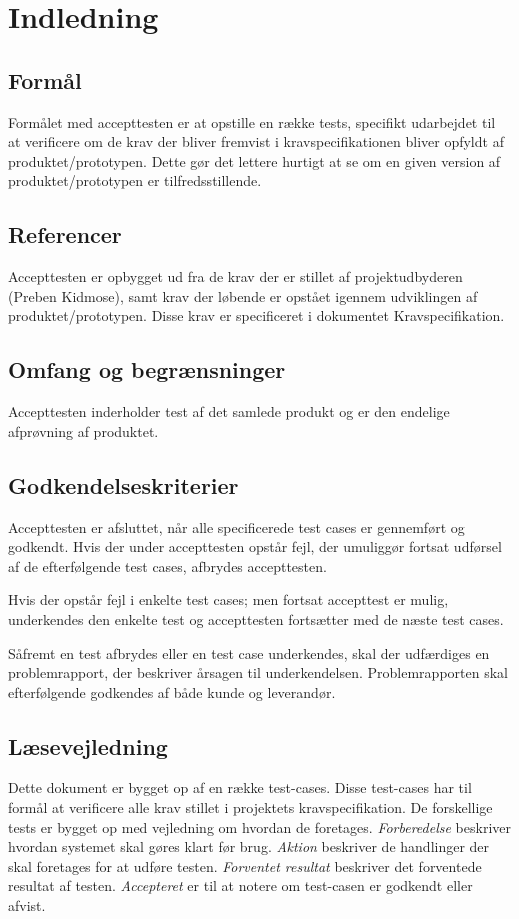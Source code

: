\documentclass[accepttest.tex]{subfiles}
\begin{document}
	\section{Indledning}
	\subsection{Formål}
	 Formålet med accepttesten er at opstille en række tests, specifikt udarbejdet til at verificere om de krav
	 der bliver fremvist i kravspecifikationen bliver opfyldt af produktet/prototypen. Dette gør det lettere hurtigt
	 at se om en given version af produktet/prototypen er tilfredsstillende.
	 \subsection{Referencer}
	  Accepttesten er opbygget ud fra de krav der er stillet af projektudbyderen (Preben Kidmose), samt
	  krav der løbende er opstået igennem udviklingen af produktet/prototypen. Disse krav er specificeret i dokumentet Kravspecifikation.
	  \subsection{Omfang og begrænsninger}
	  Accepttesten inderholder test af det samlede produkt og er den endelige
	  afprøvning af produktet.
	  \subsection{Godkendelseskriterier}
	  Accepttesten er afsluttet, når alle specificerede test cases er gennemført og godkendt.
	  Hvis der under accepttesten opstår fejl, der umuliggør fortsat udførsel af de efterfølgende test cases,
	  afbrydes accepttesten.
	  
	  Hvis der opstår fejl i enkelte test cases; men fortsat accepttest er mulig, underkendes den enkelte test og
	  accepttesten fortsætter med de næste test cases.
	  
	  Såfremt en test afbrydes eller en test case underkendes, skal der udfærdiges en problemrapport, der beskriver
	  årsagen til underkendelsen. Problemrapporten skal efterfølgende godkendes af både kunde og leverandør.

\subsection{Læsevejledning}
Dette dokument er bygget op af en række test-cases. Disse test-cases har til formål at verificere alle krav stillet i projektets kravspecifikation. De forskellige tests er bygget op med vejledning om hvordan de foretages. \textit{Forberedelse} beskriver hvordan systemet skal gøres klart før brug. \textit{Aktion} beskriver de handlinger der skal foretages for at udføre testen. \textit{Forventet resultat} beskriver det forventede resultat af testen. \textit{Accepteret} er til at notere om test-casen er godkendt eller afvist. 
\end{document}

